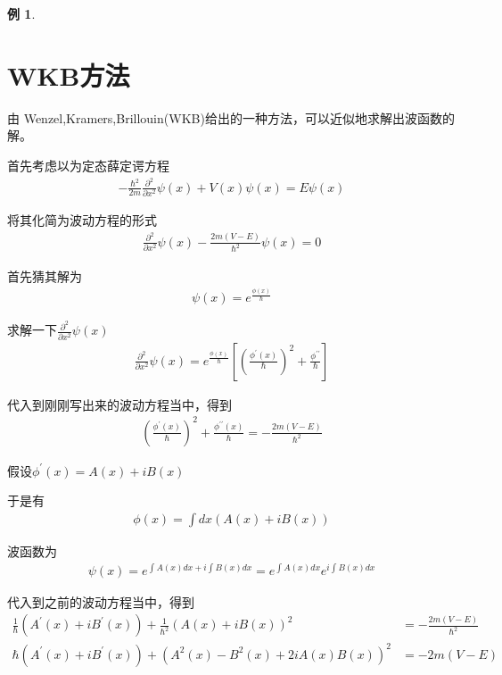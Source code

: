 \documentclass{article}
\newtheorem{example}{例}
\begin{document}
\begin{example}
\end{example}

\section{WKB方法}
由 Wenzel,Kramers,Brillouin(WKB)给出的一种方法，可以近似地求解出波函数的解。

首先考虑以为定态薛定谔方程
\begin{align*}
    -\frac{\hbar^2}{2m}\frac{\partial^2}{\partial x^2}\psi(x)+V(x)\psi(x)=E\psi(x)
\end{align*}

将其化简为波动方程的形式
\begin{align*}
    \frac{\partial^2}{\partial x^2}\psi(x)-\frac{2m(V-E)}{\hbar^2}\psi(x)=0
\end{align*}

首先猜其解为
\begin{align*}
    \psi(x)=e^{\frac{\phi(x)}{\hbar}}
\end{align*}

求解一下$\displaystyle\frac{\partial^2}{\partial x^2}\psi(x)$
\begin{align*}
    \displaystyle\frac{\partial^2}{\partial x^2}\psi(x)=e^{\frac{\phi(x)}{\hbar}}\left[\left(\frac{\phi^\prime(x)}{\hbar}\right)^2+\frac{\phi^{\prime\prime}}{\hbar}\right]
\end{align*}

代入到刚刚写出来的波动方程当中，得到
\begin{align*}
    \left(\frac{\phi^\prime(x)}{\hbar}\right)^2+\frac{\phi^{\prime\prime}(x)}{\hbar}=-\frac{2m(V-E)}{\hbar^2}
\end{align*}

假设$\phi^\prime(x)=A(x)+iB(x)$

于是有
\begin{align*}
    \phi(x)=\int dx \left(A(x)+iB(x)\right)
\end{align*}

波函数为
\begin{align*}
    \psi(x)= e^{\displaystyle\int A(x)dx+i\int B(x)dx}=e^{\displaystyle\int A(x)dx}e^{\displaystyle i\int B(x)dx}
\end{align*}

代入到之前的波动方程当中，得到
\begin{align*}
    \frac{1}{\hbar}\left(A^\prime(x)+iB^\prime(x)\right)+\frac{1}{\hbar^2}\left(A(x)+iB(x)\right)^2&=-\frac{2m(V-E)}{\hbar^2}\\
    \hbar\left(A^\prime(x)+iB^\prime(x)\right)+\left(A^2(x)-B^2(x)+2iA(x)B(x)\right)^2&=-2m(V-E)
\end{align*}
\end{document}
